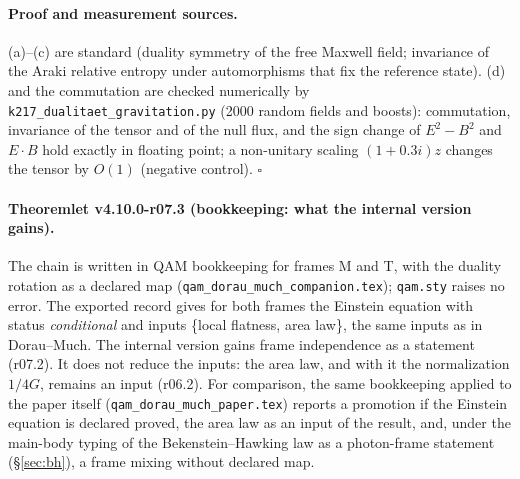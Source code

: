 \paragraph{Proof and measurement sources.}
(a)--(c) are standard (duality symmetry of the free Maxwell field; invariance of the Araki relative entropy under automorphisms that fix the
reference state).  (d) and the commutation are checked numerically by \texttt{k217\_\allowbreak dualitaet\_\allowbreak gravitation.py} (2000 random fields and
boosts): commutation, invariance of the tensor and of the null flux, and the sign change of \(E^2-B^2\) and \(E\cdot B\) hold exactly in floating point;
a non-unitary scaling \((1+0.3i)z\) changes the tensor by \(O(1)\) (negative control).  \(\square\)

\paragraph{Theoremlet v4.10.0-r07.3 (bookkeeping: what the internal version gains).}
The chain is written in QAM bookkeeping for frames M and T, with the duality rotation as a declared map
(\texttt{qam\_\allowbreak dorau\_\allowbreak much\_\allowbreak companion.tex}); \texttt{qam.sty} raises no error.  The exported record gives for both frames the
Einstein equation with status \emph{conditional} and inputs \{local flatness, area law\}, the same inputs as in Dorau--Much.  The internal version
gains frame independence as a statement (r07.2).  It does not reduce the inputs: the area law, and with it the normalization \(1/4G\), remains an
input (r06.2).  For comparison, the same bookkeeping applied to the paper itself (\texttt{qam\_\allowbreak dorau\_\allowbreak much\_\allowbreak paper.tex}) reports a
promotion if the Einstein equation is declared proved, the area law as an input of the result, and, under the main-body typing of the
Bekenstein--Hawking law as a photon-frame statement (\S\ref{sec:bh}), a frame mixing without declared map.

